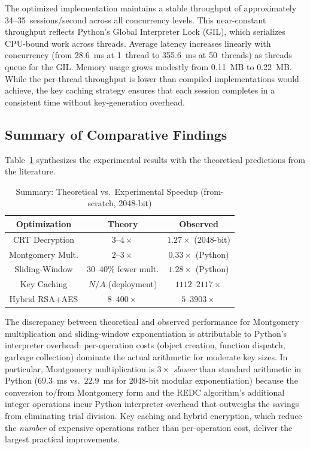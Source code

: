 \documentclass[journal]{IEEEtran}
\begin{document}
The optimized implementation maintains a stable throughput of approximately 34--35~sessions/second across all concurrency levels. This near-constant throughput reflects Python's Global Interpreter Lock (GIL), which serializes CPU-bound work across threads. Average latency increases linearly with concurrency (from 28.6~ms at 1~thread to 355.6~ms at 50~threads) as threads queue for the GIL. Memory usage grows modestly from 0.11~MB to 0.22~MB. While the per-thread throughput is lower than compiled implementations would achieve, the key caching strategy ensures that each session completes in a consistent time without key-generation overhead.

\subsection{Summary of Comparative Findings}

Table~\ref{tab:summary} synthesizes the experimental results with the theoretical predictions from the literature.

\begin{table}[H]
\caption{Summary: Theoretical vs.\ Experimental Speedup (from-scratch, 2048-bit)}
\label{tab:summary}
\centering
\begin{tabular}{|c|c|c|}
\hline
\textbf{Optimization} & \textbf{Theory} & \textbf{Observed} \\
\hline
CRT Decryption & $3$--$4\times$ & $1.27\times$ (2048-bit) \\
\hline
Montgomery Mult. & $2$--$3\times$ & $0.33\times$ (Python) \\
\hline
Sliding-Window & $30$--$40\%$ fewer mult. & $1.28\times$ (Python) \\
\hline
Key Caching & $N/A$ (deployment) & $1112$--$2117\times$ \\
\hline
Hybrid RSA+AES & $8$--$400\times$ & $5$--$3903\times$ \\
\hline
\end{tabular}
\end{table}

The discrepancy between theoretical and observed performance for Montgomery multiplication and sliding-window exponentiation is attributable to Python's interpreter overhead: per-operation costs (object creation, function dispatch, garbage collection) dominate the actual arithmetic for moderate key sizes. In particular, Montgomery multiplication is $3\times$ \textit{slower} than standard arithmetic in Python ($69.3$~ms vs.\ $22.9$~ms for 2048-bit modular exponentiation) because the conversion to/from Montgomery form and the REDC algorithm's additional integer operations incur Python interpreter overhead that outweighs the savings from eliminating trial division. Key caching and hybrid encryption, which reduce the \textit{number} of expensive operations rather than per-operation cost, deliver the largest practical improvements.
\end{document}
